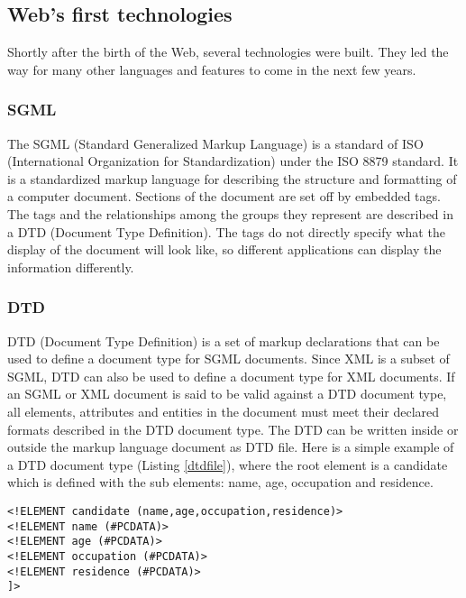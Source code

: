 \subsection{Web's first technologies}

Shortly after the birth of the Web, several technologies were built. They led the way for many other languages and features to come in the next few years.  


\subsubsection{SGML}
\label{subsubsec_sgml}
The SGML (Standard Generalized Markup Language) is a standard of ISO (International Organization for Standardization) under the ISO 8879 standard. It is a standardized markup language for describing the structure and formatting of a computer document. Sections of the document are set off by embedded tags. The tags and the relationships among the groups they represent are described in a DTD (Document Type Definition). The tags do not directly specify what the display of the document will look like, so different applications can display the information differently. 

\subsubsection{DTD}
\label{subsubsec_dtd}

DTD  (Document Type Deﬁnition) is a set of markup declarations that can be used to define a document type for SGML documents. Since XML is a subset of SGML, DTD can also be used to define a document type for XML documents. If an SGML or XML document is said to be valid against a DTD document type, all elements, attributes and entities in the document must meet their declared formats described in the DTD document type. The DTD can be written inside or outside the markup language document as DTD file. Here is a simple example of a DTD document type (Listing \ref{dtdfile}), where the root element is a candidate which is defined with the sub elements: name, age, occupation and residence.\\  

\begin{lstlisting}[captionpos=b, caption=An example of a DTD file, label={dtdfile},
basicstyle=\footnotesize,frame=none]
<!ELEMENT candidate (name,age,occupation,residence)>
<!ELEMENT name (#PCDATA)>
<!ELEMENT age (#PCDATA)>
<!ELEMENT occupation (#PCDATA)>
<!ELEMENT residence (#PCDATA)>
]>     
\end{lstlisting}


